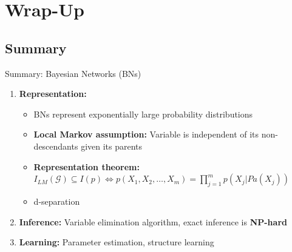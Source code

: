 \begin{frame}[plain]{}{}
	
\end{frame}


\section{Wrap-Up}

\subsection{Summary}

\begin{frame}{Summary: Bayesian Networks (BNs)}{}
	\begin{enumerate}
		\item \textbf{Representation:}
		\begin{itemize}
			\item BNs represent exponentially large probability distributions
			\item \textbf{Local Markov assumption:} Variable is independent of its non-descendants given its parents
			\item \textbf{Representation theorem:}
				$I_{LM}(\mathcal{G}) \subseteq I(p) \Leftrightarrow p(X_1, X_2, \dots, X_m) =
					\prod_{j=1}^m p(X_j \vert Pa(X_j))$
			\item d-separation
		\end{itemize}
		\item \textbf{Inference:} Variable elimination algorithm, exact inference is \textbf{NP-hard}
		\item \textbf{Learning:} Parameter estimation, structure learning
	\end{enumerate}
\end{frame}


